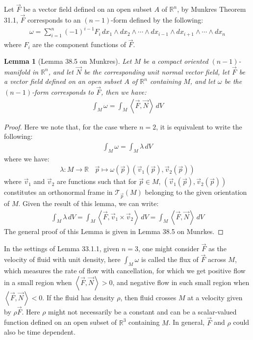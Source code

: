 \documentclass[15pt]{book}
\theoremstyle{break}
\theoremstyle{break}
\newtheorem{lem}{Lemma}[thm]
\newcommand{\R}{\mathbb{R}}
\newcommand{\T}{\mathcal{T}}
\begin{document}
Let $\vec{F}$ be a vector field defined on an open subset $A$ of $\R^n$, by Munkres Theorem 31.1, $\vec{F}$ corresponds to an $(n-1)$-form defined by the following:
\begin{align*}
\omega = \sum_{i=1}^n (-1)^{i-1}F_i\, dx_1 \wedge dx_2 \wedge \cdots \wedge dx_{i-1}\wedge dx_{i+1}\wedge \cdots \wedge dx_n
\end{align*}
where $F_i$ are the component functions of $\vec{F}$. 

\begin{lem}[Lemma 38.5 on Munkres]
Let $M$ be a compact oriented $(n-1)$-manifold in $\R^n$, and let $\vec{N}$ be the corresponding unit normal vector field, let $\vec{F}$ be a vector field defined on an open subset $A$ of $\R^n$ containing $M$, and let $\omega$ be the $(n-1)$-form corresponds to $\vec{F}$, then we have:
\begin{align*}
\int_M \omega = \int_M \left< \vec{F},\vec{N}\right> \, dV
\end{align*}
\end{lem}
\begin{proof}
Here we note that, for the case where $n=2$, it is equivalent to write the following:
\begin{align*}
\int_M \omega = \int_M \lambda\, dV 
\end{align*}
where we have:
\begin{align*}
\lambda:M \to \R \ \ \ \ \vec{p}\mapsto \omega(\vec{p})(\vec{v}_1(\vec{p}),\vec{v}_2(\vec{p})) 
\end{align*}
where $\vec{v}_1$ and $\vec{v}_2$ are functions such that for $\vec{p}\in M$, $(\vec{v}_1(\vec{p}),\vec{v}_2(\vec{p})) $ constitutes an orthonormal frame in $\T_{\vec{p}}(M)$ belonging to the given orientation of $M$. Given the result of this lemma, we can write:
\begin{align*}
\int_M \lambda\, dV  =  \int_M \left< \vec{F},\vec{v}_1\times \vec{v}_2\right> \, dV =   \int_M \left< \vec{F},\vec{N}\right> \, dV
\end{align*}
The general proof of this Lemma is given in Lemma 38.5 on Munrkes. 
\end{proof}

In the settings of Lemma 33.1.1, given $n=3$, one might consider $\vec{F}$ as the velocity of fluid with unit density, here $\int_M \omega$ is called the flux of $\vec{F}$ across $M$, which measures the rate of flow with cancellation, for which we get positive flow in a small region when $\left<\right.\vec{F}, \vec{N}\left.\right>>0$, and negative flow in such small region when $\left<\right.\vec{F},\vec{N}\left.\right>< 0$. If the fluid has density $\rho$, then fluid crosses $M$ at a velocity given by $\rho \vec{F}$. Here $\rho$ might not necessarily be a constant and can be a scalar-valued function defined on an open subset of $\R^3$ containing $M$. In general, $\vec{F}$ and $\rho$ could also be time dependent. \\
\end{document}
